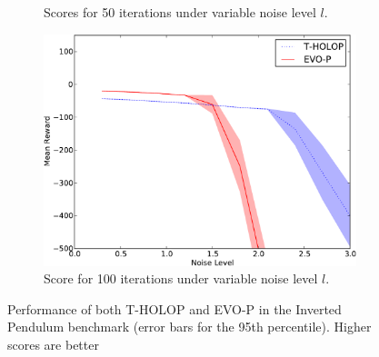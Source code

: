 \documentclass[conference]{IEEEtran}
\begin{document}
\begin{figure}[ht]
\begin{subfigure}[b]{0.32\textwidth}
                \caption{Scores for 50 iterations under variable noise level $l$.}
                \label{fig:IP-N-50}
        \end{subfigure}  \begin{subfigure}[b]{0.32\textwidth}
                \centering
                \includegraphics[width=1.0\textwidth]{graphics/online-noise-IP_100-crop.pdf}
                \caption{Score for 100 iterations under variable noise level $l$.}
                \label{fig:IP-N-100}
        \end{subfigure}%

         \caption{Performance of both T-HOLOP and EVO-P in the Inverted Pendulum benchmark (error bars for the 95th percentile). Higher scores are better}
         \label{fig:IP-all}

\end{figure}
\end{document}
